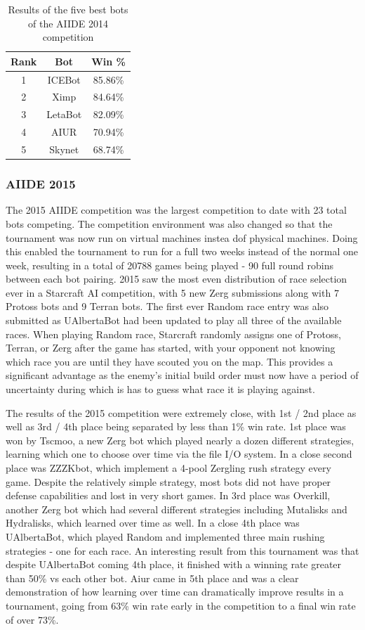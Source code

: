 \documentclass{llncs}
\begin{document}
\begin{table}[!t]
\caption{Results of the five best bots of the AIIDE 2014 competition}
\label{tab:aiide2014}
\centering
\begin{tabular}{|c|c|c|}
\hline
{\bfseries Rank} & {\bfseries Bot} & {\bfseries Win \%} \\
\hline
1 & ICEBot & 85.86\% \\
2 & Ximp & 84.64\% \\
3 & LetaBot & 82.09\% \\
4 & AIUR & 70.94\% \\
5 & Skynet & 68.74\% \\
\hline
\end{tabular}
\end{table}

\subsubsection{AIIDE 2015}

The 2015 AIIDE competition was the largest competition to date with 23 total bots competing. The competition environment was also changed so that the tournament was now run on virtual machines instea dof physical machines. Doing this enabled the tournament to run for a full two weeks instead of the normal one week, resulting in a total of 20788 games being played - 90 full round robins between each bot pairing. 2015 saw the most even distribution of race selection ever in a Starcraft AI competition, with 5 new Zerg submissions along with 7 Protoss bots and 9 Terran bots. The first ever Random race entry was also submitted as UAlbertaBot had been updated to play all three of the available races. When playing Random race, Starcraft randomly assigns one of Protoss, Terran, or Zerg after the game has started, with your opponent not knowing which race you are until they have scouted you on the map. This provides a significant advantage as the enemy's initial build order must now have a period of uncertainty during which is has to guess what race it is playing against.

The results of the 2015 competition were extremely close, with 1st / 2nd place as well as 3rd / 4th place being separated by less than 1\% win rate. 1st place was won by Tscmoo, a new Zerg bot which played nearly a dozen different strategies, learning which one to choose over time via the file I/O system. In a close second place was ZZZKbot, which implement a 4-pool Zergling rush strategy every game. Despite the relatively simple strategy, most bots did not have proper defense capabilities and lost in very short games. In 3rd place was Overkill, another Zerg bot which had several different strategies including Mutalisks and Hydralisks, which learned over time as well. In a close 4th place was UAlbertaBot, which played Random and implemented three main rushing strategies - one for each race. An interesting result from this tournament was that despite UAlbertaBot coming 4th place, it finished with a winning rate greater than 50\% vs each other bot. Aiur came in 5th place and was a clear demonstration of how learning over time can dramatically improve results in a tournament, going from 63\% win rate early in the competition to a final win rate of over 73\%.
\end{document}
